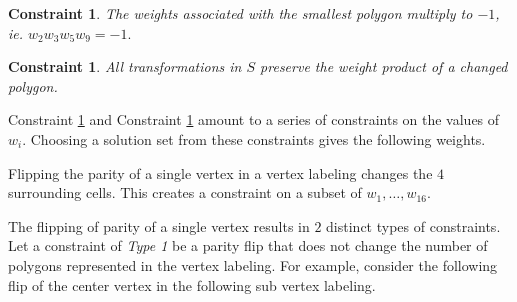 \documentclass[12pt]{article}
\theoremstyle{plain}
\newtheorem{constraint}[thm]{Constraint}
\theoremstyle{definition}
\theoremstyle{remark}
\theoremstyle{definition}
\newcommand{\cell}[4]{ \draw[thick] ( #1 , #2 ) rectangle ( #3 , #4 );}
\newcommand{\lablnode}[3]{\node[shape=circle,draw=none,fill=none, inner sep=0pt,minimum size=5pt] (A) at ( #1 , #2 ) {#3};}
\newcommand{\lablvertex}[3]{\node[shape=circle,draw=none,fill=white, inner sep=2pt,minimum size=5pt] (A) at ( #1 , #2 ) {#3};}
\begin{document}
\begin{constraint}\label{constraint: smallest sap prod}
    The weights associated with the smallest polygon multiply to $-1$, ie. $w_2 w_3 w_5 w_9 = -1.$ 
\end{constraint}

\begin{constraint}\label{constraint: prod works}
    All transformations in $S$ preserve the weight product of a changed polygon.
\end{constraint}

Constraint \ref{constraint: smallest sap prod} and Constraint \ref{constraint: prod works} amount to a series of constraints on the values of $w_i$. Choosing a solution set from these constraints gives the following weights.

Flipping the parity of a single vertex in a vertex labeling changes the $4$ surrounding cells. This creates a constraint on a subset of $w_1 ,\dots, w_{16}.$ 

The flipping of parity of a single vertex results in $2$ distinct types of constraints. Let a constraint of \textit{Type 1} be a parity flip that does not change the number of polygons represented in the vertex labeling. For example, consider the following flip of the center vertex in the following sub vertex labeling.

\begin{center}
\end{center}
\end{document}
